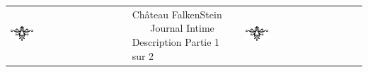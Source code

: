 \documentclass[a5paper,pagesize,french]{book}
\begin{document}
\setlength\parindent{0pt} %





\begin{center}
	\begin{tabular}[c]{ p{} p{} p{} }
		\includegraphics[width=0.20\textwidth]{../../images/artsdecos/ornement01whiteBG.png} & 
			\centering
			{ \Huge{\setmainfont{Chomsky} Château FalkenStein } }~\newline~\newline~\newline
			{ \LARGE{ \setmainfont{Z003} Journal Intime } }
			{ \Large{ \setmainfont{Z003} Description Partie 1 sur 2} }
		& \includegraphics[width=0.20\textwidth]{../../images/artsdecos/ornement01whiteBG.png} \\
	\end{tabular}
\end{center}
\end{document}

